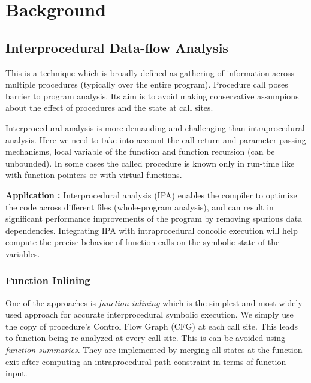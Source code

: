\documentclass[12pt,oneside]{book}
\begin{document}

\newpage
\chapter{Background}


\section {Interprocedural Data-flow Analysis}
This is a technique which is broadly defined as gathering of information across multiple procedures (typically over the entire program). Procedure call poses barrier to program analysis. Its aim is to avoid making conservative assumpions about the effect of procedures and the state at call sites.

Interprocedural analysis is more demanding and challenging than intraprocedural analysis. Here we need to take into account the call-return and parameter passing mechanisms, local variable of the function and function recursion (can be unbounded). In some cases the called procedure is known only in run-time like with function pointers or with virtual functions. 

\textbf{Application :} Interprocedural analysis (IPA) enables the compiler to optimize the code across different files (whole-program analysis), and can result in significant performance improvements of the program by removing spurious data dependencies. Integrating IPA with intraprocedural concolic execution will help compute the precise behavior of function calls on the symbolic state of the variables.


\subsection {Function Inlining}
One of the approaches is \textit{function inlining} which is the simplest and most widely used approach for accurate interprocedural symbolic execution. We simply use the copy of procedure's Control Flow Graph (CFG) at each call site. This leads to function being re-analyzed at every call site. This is can be avoided using \textit{function summaries}. They are implemented by merging all states at the function exit after computing an intraprocedural path constraint in terms of function input.\\ 
\end{document}
